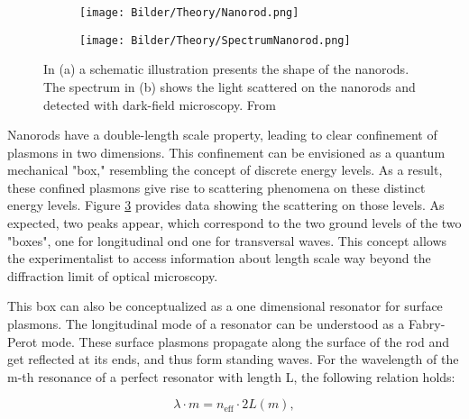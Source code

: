 \begin{figure}[ht]
    \centering
    \begin{subfigure}{0.48\linewidth}
      \texttt{[image: Bilder/Theory/Nanorod.png]}
      \caption{}
      \label{fig:Nanorod}
    \end{subfigure}
    \hfill
    \begin{subfigure}{0.48\linewidth}
      \texttt{[image: Bilder/Theory/SpectrumNanorod.png]}
      \caption{}
      \label{fig:SpecNanorod}
    \end{subfigure}
    \caption{In (a) a schematic illustration presents the shape of the nanorods. The spectrum in (b) shows the light scattered on the nanorods and detected with dark-field microscopy. From \cite{LehrstuhlExperimentalphysikIII.2023}}
    \label{fig:nanoplasmonics}
\end{figure}

Nanorods have a double-length scale property, leading to clear confinement of plasmons in two dimensions. This confinement can be envisioned as a quantum mechanical "box," resembling the concept of discrete energy levels. As a result, these confined plasmons give rise to scattering phenomena on these distinct energy levels. Figure \ref{fig:nanoplasmonics} provides data showing the scattering on those levels. As expected, two peaks appear, which correspond to the two ground levels of the two "boxes", one for longitudinal ond one for transversal waves.
This concept allows the experimentalist to access information about length scale way beyond the diffraction limit of optical microscopy.

This box can also be conceptualized as a one dimensional resonator for surface plasmons.
The longitudinal mode of a resonator can be understood as a Fabry-Perot mode. These surface plasmons propagate along the surface of the rod and get reflected at its ends, and thus form standing waves. For the wavelength of the m-th resonance of a perfect resonator with length L, the following relation holds:

\begin{equation}
    \lambda\cdot m = n_{\mathrm{eff}}\cdot 2L(m),
\end{equation}

